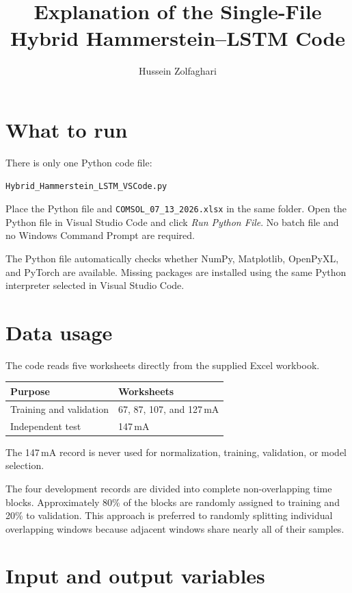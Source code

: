\documentclass[11pt]{article}
\title{Explanation of the Single-File Hybrid Hammerstein--LSTM Code}
\author{Hussein Zolfaghari}
\date{}
\begin{document}
\maketitle
\tableofcontents
\newpage

\section{What to run}

There is only one Python code file:

\begin{center}
\texttt{Hybrid\_Hammerstein\_LSTM\_VSCode.py}
\end{center}

Place the Python file and \texttt{COMSOL\_07\_13\_2026.xlsx} in the same folder. Open the Python file in Visual Studio Code and click \emph{Run Python File}. No batch file and no Windows Command Prompt are required.

The Python file automatically checks whether NumPy, Matplotlib, OpenPyXL, and PyTorch are available. Missing packages are installed using the same Python interpreter selected in Visual Studio Code.

\section{Data usage}

The code reads five worksheets directly from the supplied Excel workbook.

\begin{table}[H]
\centering
\begin{tabular}{ll}
\toprule
Purpose & Worksheets \\
\midrule
Training and validation &
67, 87, 107, and 127\,mA \\
Independent test &
147\,mA \\
\bottomrule
\end{tabular}
\end{table}

The 147\,mA record is never used for normalization, training, validation, or model selection.

The four development records are divided into complete non-overlapping time blocks. Approximately 80\% of the blocks are randomly assigned to training and 20\% to validation. This approach is preferred to randomly splitting individual overlapping windows because adjacent windows share nearly all of their samples.

\section{Input and output variables}
\end{document}
